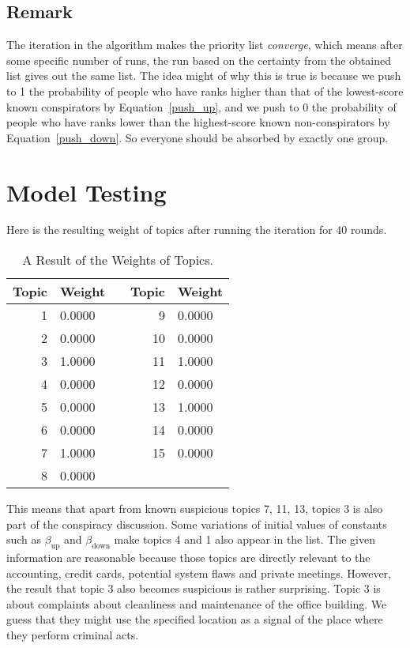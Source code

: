 \documentclass{icmmcm}
\begin{document}
\subsection{Remark}
The iteration in the algorithm makes the priority list 
\textit{converge}, which means after some specific
number of runs, the run based on the certainty from the obtained list gives out the same list.
The idea might of why this is true is because we push to 1 the 
probability of people who have
ranks higher than that of the lowest-score known conspirators
by Equation~\eqref{push_up}, and we push to 0 the 
probability of people who have ranks lower than the highest-score known non-conspirators by Equation~\eqref{push_down}.
So everyone should be absorbed by exactly one group. 

\section{Model Testing}
Here is the resulting weight of topics after
running the iteration for 40 rounds.
\begin{table}[htb]
\begin{center}
\begin{tabular}{|r|l|c|r|l|} 
\toprule
Topic	& Weight && Topic &Weight\\
\midrule   
\hline
1    	&0.0000	&& 9    	&0.0000\\
2    	&0.0000 && 10   	&0.0000\\
3    	&1.0000 && 11   	&1.0000\\
4    	&0.0000 && 12   	&0.0000\\
5    	&0.0000 && 13   	&1.0000\\
6    	&0.0000 && 14   	&0.0000\\
7    	&1.0000 && 15   	&0.0000\\
8    	&0.0000 && &\\
\bottomrule	
    \end{tabular}
  \end{center}
  \caption[A Result of the Weights of Topics]
  {A Result of the Weights of Topics.}
  \label{tab:topics}
\end{table}
This means that apart from known suspicious topics 7, 11, 13,
topics 3 is also part of the conspiracy discussion. Some variations of initial values of constants such as $\beta_{\text{up}}$ and $\beta_{\text{down}}$
make topics 4 and 1 also appear in the list. The given information are reasonable because those
topics are directly relevant to the accounting, credit cards, potential system flaws and private meetings.
However, the result that topic 3 also becomes suspicious
is rather surprising. Topic 3 is about complaints about
cleanliness and maintenance of the office building. 
We guess that they might use the specified location
as a signal of the place where they perform criminal acts.
\end{document}
